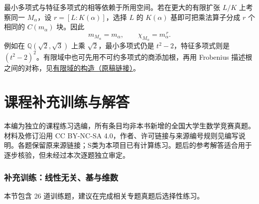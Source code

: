 \documentclass[12pt,fontset=fandol]{ctexart}
\begin{document}
最小多项式与特征多项式的相等依赖于所用空间。若在更大的有限扩张 $L/K$ 上考察同一 $M_\alpha$，设 $r=[L:K(\alpha)]$，选择 $L$ 的 $K(\alpha)$ 基即可把乘法算子分成 $r$ 个相同的 $C(m_\alpha)$ 块。因此
\[
m_{M_\alpha}=m_\alpha,\qquad
\chi_{M_\alpha}=m_\alpha^{\,r}.
\]
例如在 $\mathbb Q(\sqrt2,\sqrt3)$ 上乘 $\sqrt2$，最小多项式仍是 $t^2-2$，特征多项式则是 $(t^2-2)^2$。有限域中也可先用不可约多项式的商添加根，再用 Frobenius 描述根之间的对称，见\href{https://github.com/lzxcr/cmc-mathematics/blob/64916fa1fdbc3e444a652eca204d5669058ee321/src/methods/outer/01-algebra.md}{有限域的构造（原稿链接）}。

\part{课程补充训练与解答}

本编为独立的课程练习选编，所有条目均非本书新增的全国大学生数学竞赛真题。材料及修订沿用 CC BY-NC-SA 4.0，作者、许可链接与来源编号规则见编写说明。各题保留原来源链接；S类为本项目已有计算练习。题后的参考解答适合用于逐步核验，但未经过本次逐题独立审定。

\section{补充训练：线性无关、基与维数}

本节包含 26 道训练题，建议在完成相关专题真题后选择性练习。
\end{document}
